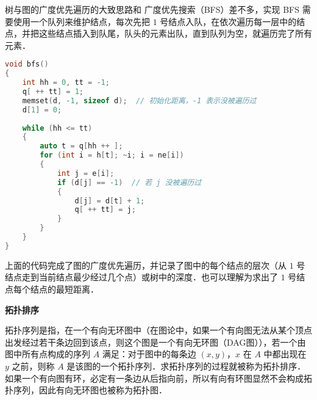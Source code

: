 
树与图的广度优先遍历的大致思路和 广度优先搜索（BFS）差不多，实现 BFS 需要使用一个队列来维护结点，每次先把 $1$ 号结点入队，在依次遍历每一层中的结点，并把这些结点插入到队尾，队头的元素出队，直到队列为空，就遍历完了所有元素．

\begin{lstlisting}[language=cpp]
void bfs()
{
    int hh = 0, tt = -1;
    q[ ++ tt] = 1;
    memset(d, -1, sizeof d);  // 初始化距离，-1 表示没被遍历过
    d[1] = 0;
    
    while (hh <= tt)
    {
        auto t = q[hh ++ ];
        for (int i = h[t]; ~i; i = ne[i])
        {
            int j = e[i];
            if (d[j] == -1)  // 若 j 没被遍历过
            {
                d[j] = d[t] + 1;
                q[ ++ tt] = j;
            }
        }
    }
}
\end{lstlisting}

上面的代码完成了图的广度优先遍历，并记录了图中的每个结点的层次（从 $1$ 号结点走到当前结点最少经过几个点）或树中的深度．也可以理解为求出了 $1$ 号结点每个结点的最短距离．

\textbf{拓扑排序}

拓扑序列是指，在一个有向无环图中（在图论中，如果一个有向图无法从某个顶点出发经过若干条边回到该点，则这个图是一个有向无环图（DAG图）），若一个由图中所有点构成的序列 $A$ 满足：对于图中的每条边 $(x, y)$，$x$ 在 $A$ 中都出现在 $y$ 之前，则称 $A$ 是该图的一个拓扑序列．求拓扑序列的过程就被称为拓扑排序．如果一个有向图有环，必定有一条边从后指向前，所以有向有环图显然不会构成拓扑序列，因此有向无环图也被称为拓扑图．

